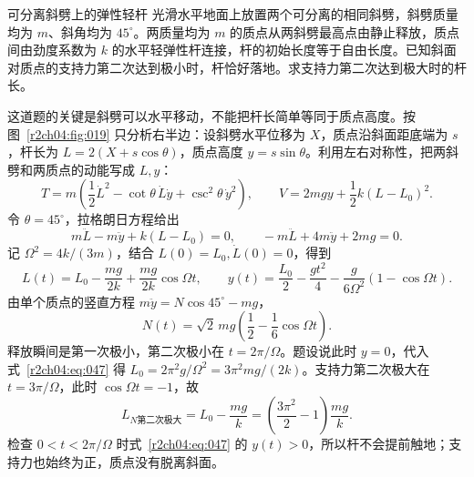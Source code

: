 \begin{practicebox}{可分离斜劈上的弹性轻杆}
光滑水平地面上放置两个可分离的相同斜劈，斜劈质量均为 $m$、斜角均为 $45^\circ$。两质量均为 $m$ 的质点从两斜劈最高点由静止释放，质点间由劲度系数为 $k$ 的水平轻弹性杆连接，杆的初始长度等于自由长度。已知斜面对质点的支持力第二次达到极小时，杆恰好落地。求支持力第二次达到极大时的杆长。
\label{r2ch04:pr:004}
\begin{solution}
这道题的关键是斜劈可以水平移动，不能把杆长简单等同于质点高度。按图~\ref{r2ch04:fig:019} 只分析右半边：设斜劈水平位移为 $X$，质点沿斜面距底端为 $s$，杆长为 $L=2(X+s\cos\theta)$，质点高度 $y=s\sin\theta$。利用左右对称性，把两斜劈和两质点的动能写成 $L,y$：
\begin{equation}
 T=m\left(\frac12\dot L^2-\cot\theta\,\dot L\dot y+\csc^2\theta\,\dot y^2\right),\qquad
 V=2mgy+\frac12k(L-L_0)^2.
 \label{r2ch04:eq:046}
\end{equation}
令 $\theta=45^\circ$，拉格朗日方程给出
\[
 m\ddot L-m\ddot y+k(L-L_0)=0,\qquad
 -m\ddot L+4m\ddot y+2mg=0.
\]
记 $\Omega^2=4k/(3m)$，结合 $L(0)=L_0,\dot L(0)=0$，得到
\begin{equation}
 L(t)=L_0-\frac{mg}{2k}+\frac{mg}{2k}\cos\Omega t,\qquad
 y(t)=\frac{L_0}{2}-\frac{gt^2}{4}-\frac{g}{6\Omega^2}(1-\cos\Omega t).
 \label{r2ch04:eq:047}
\end{equation}
由单个质点的竖直方程 $m\ddot y=N\cos45^\circ-mg$，
\[
 N(t)=\sqrt2\,mg\left(\frac12-\frac16\cos\Omega t\right).
\]
释放瞬间是第一次极小，第二次极小在 $t=2\pi/\Omega$。题设说此时 $y=0$，代入式~\eqref{r2ch04:eq:047} 得
$L_0=2\pi^2g/\Omega^2=3\pi^2mg/(2k)$。支持力第二次极大在 $t=3\pi/\Omega$，此时 $\cos\Omega t=-1$，故
\begin{equation}
 \boxed{L_{N\text{第二次极大}}=L_0-\frac{mg}{k}
 =\left(\frac{3\pi^2}{2}-1\right)\frac{mg}{k}}.
 \label{r2ch04:eq:048}
\end{equation}
检查 $0<t<2\pi/\Omega$ 时式~\eqref{r2ch04:eq:047} 的 $y(t)>0$，所以杆不会提前触地；支持力也始终为正，质点没有脱离斜面。
\figSeparatingWedges
\end{solution}
\end{practicebox}

